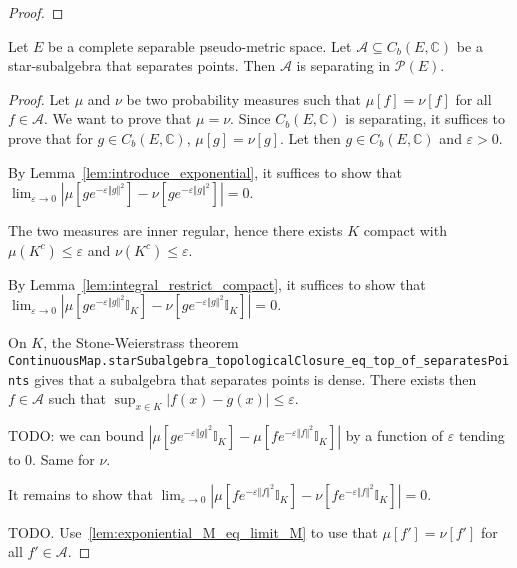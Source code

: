 \begin{proof}
\end{proof}

\begin{theorem}\label{thm:separating_starSubalgebra}
Let $E$ be a complete separable pseudo-metric space. Let $\mathcal A \subseteq C_b(E, \mathbb{C})$ be a star-subalgebra that separates points. Then $\mathcal A$ is separating in $\mathcal P(E)$.
\end{theorem}

\begin{proof}
Let $\mu$ and $\nu$ be two probability measures such that $\mu[f] = \nu[f]$ for all $f \in \mathcal A$. We want to prove that $\mu = \nu$. Since $C_b(E, \mathbb{C})$ is separating, it suffices to prove that for $g \in C_b(E, \mathbb{C})$, $\mu[g] = \nu[g]$. Let then $g \in C_b(E, \mathbb{C})$ and $\varepsilon > 0$.

By Lemma~\ref{lem:introduce_exponential}, it suffices to show that $\lim_{\varepsilon \to 0} \left\vert \mu\left[g e^{-\varepsilon \Vert g \Vert^2} \right] - \nu\left[g e^{-\varepsilon \Vert g \Vert^2} \right] \right\vert = 0$.

The two measures are inner regular, hence there exists $K$ compact with $\mu(K^c) \le \varepsilon$ and $\nu(K^c) \le \varepsilon$.

By Lemma~\ref{lem:integral_restrict_compact}, it suffices to show that $\lim_{\varepsilon \to 0} \left\vert \mu\left[g e^{-\varepsilon \Vert g \Vert^2} \mathbb{I}_K \right] - \nu\left[g e^{-\varepsilon \Vert g \Vert^2} \mathbb{I}_K \right] \right\vert = 0$.

On $K$, the Stone-Weierstrass theorem \texttt{ContinuousMap.starSubalgebra\_topologicalClosure\_eq\_top\_of\_separatesPoints} gives that a subalgebra that separates points is dense. There exists then $f \in \mathcal A$ such that $\sup_{x \in K} \left\vert f(x) - g(x) \right\vert \le \varepsilon$.

TODO: we can bound $\left\vert \mu\left[g e^{-\varepsilon \Vert g \Vert^2} \mathbb{I}_K \right] - \mu\left[f e^{-\varepsilon \Vert f \Vert^2} \mathbb{I}_K \right] \right\vert$ by a function of $\varepsilon$ tending to 0. Same for $\nu$.

It remains to show that $\lim_{\varepsilon \to 0} \left\vert \mu\left[f e^{-\varepsilon \Vert f \Vert^2} \mathbb{I}_K \right] - \nu\left[f e^{-\varepsilon \Vert f \Vert^2} \mathbb{I}_K \right] \right\vert = 0$.

TODO. Use~\ref{lem:exponiential_M_eq_limit_M} to use that $\mu[f'] = \nu[f']$ for all $f' \in \mathcal A$.
\end{proof}

